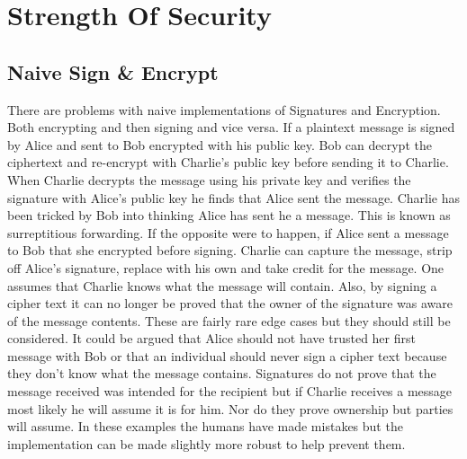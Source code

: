 
\chapter{Strength Of Security}
\label{stre}

\section{Naive Sign \& Encrypt}

There are problems with naive implementations of Signatures and Encryption. Both encrypting and then signing and vice versa. If a plaintext message is signed by Alice and sent to Bob encrypted with his public key. Bob can decrypt the ciphertext and re-encrypt with Charlie's public key before sending it to Charlie. When Charlie decrypts the message using his private key and verifies the signature with Alice's public key he finds that Alice sent the message. Charlie has been tricked by Bob into thinking Alice has sent he a message. This is known as surreptitious forwarding. If the opposite were to happen, if Alice sent a message to Bob that she encrypted before signing. Charlie can capture the message, strip off Alice's signature, replace with his own and take credit for the message. One assumes that Charlie knows what the message will contain. Also, by signing a cipher text it can no longer be proved that the owner of the signature was aware of the message contents. These are fairly rare edge cases but they should still be considered. It could be argued that Alice should not have trusted her first message with Bob or that an individual should never sign a cipher text because they don't know what the message contains. Signatures do not prove that the message received was intended for the recipient but if Charlie receives a message most likely he will assume it is for him. Nor do they prove ownership but parties will assume. In these examples the humans have made mistakes but the implementation can be made slightly more robust to help prevent them\cite{signencrypt}.

